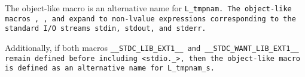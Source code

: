 The object-like macro  is an alternative name for \tt{L_tmpnam}.
The object-like macros , , and 
expand to non-lvalue expressions corresponding to the standard
I/O streams \tt{stdin}, \tt{stdout}, and \tt{stderr}.

Additionally, if both macros \tt{__STDC_LIB_EXT1__} and
\tt{__STDC_WANT_LIB_EXT1__} remain defined before including \tt{<stdio._>},
then the object-like macro  is
defined as an alternative name for \tt{L_tmpnam_s}.
